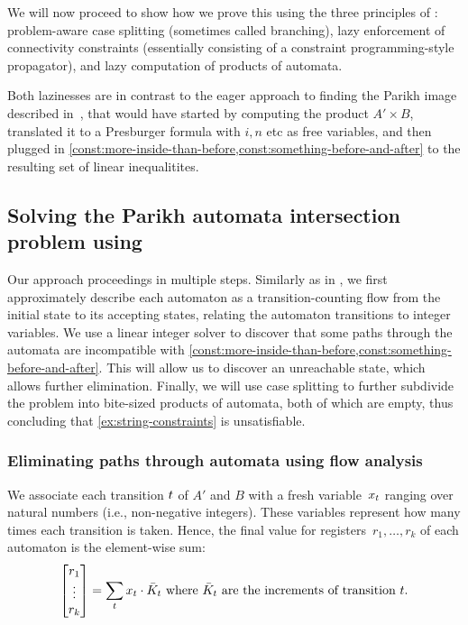 We will now proceed to show how we prove this using the three principles of
\Calculus{}: problem-aware case splitting (sometimes called branching), lazy
enforcement of connectivity constraints (essentially consisting of a constraint
programming-style propagator), and lazy computation of products of automata.

Both lazinesses are in contrast to the eager approach to finding the Parikh
image described in~\cite{generate-parikh-image}, that would have started by
computing the product $A' \times B$, translated it to a Presburger formula with
$i, n$ etc as free variables, and then plugged in
\cref{const:more-inside-than-before,const:something-before-and-after} to the
resulting set of linear inequalitites.

\subsection{Solving the Parikh automata intersection problem using \Calculus{}}

Our approach proceedings in multiple steps. Similarly as in
\cite{generate-parikh-image}, we first approximately describe each
automaton as a transition-counting flow from the initial state to its accepting
states, relating the automaton transitions to integer variables.
We use a linear integer solver to discover that some paths through the automata are incompatible
with \cref{const:more-inside-than-before,const:something-before-and-after}. This
will allow us to discover an unreachable state, which allows further
elimination. Finally, we will use case splitting to further subdivide the
problem into bite-sized products of automata, both of which are empty, thus
concluding that \cref{ex:string-constraints} is unsatisfiable.

\subsubsection{Eliminating paths through automata using flow analysis}\label{sec:a_1}

We associate each transition $t$ of $A'$ and $B$ with a fresh
variable~$x_t$ ranging over natural numbers (i.e.,
non-negative integers).
These variables represent how many times each
transition is taken. Hence, the final value for registers~$r_1, \ldots,
r_k$ of each automaton is the element-wise sum:
\begin{equation}\label{eq:counter-sums}
\begin{bmatrix} 
  r_1 \\
  \vdots\\
  r_k \\
\end{bmatrix} = \sum_t x_t \cdot 
  \bar{K}_t \text{ where $\bar{K}_t$ are the increments of transition $t$}.
\end{equation}

